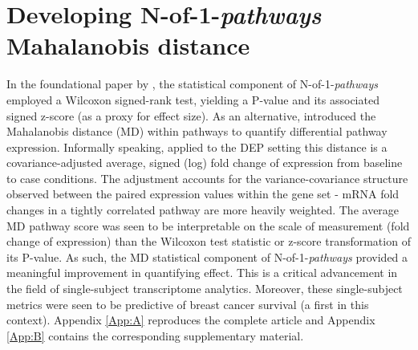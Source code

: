 \chapter{Developing N-of-1-\emph{pathways} \\Mahalanobis distance} \label{Chap:md}

\indent \indent In the foundational paper by \citet{Gardeux2014}, the statistical component of N-of-1-\emph{pathways} employed a Wilcoxon signed-rank test, yielding a P-value and its associated signed z-score (as a proxy for effect size). As an alternative, \citet{Schissler2015} introduced the Mahalanobis distance (MD) within pathways to quantify differential pathway expression. Informally speaking, applied to the DEP setting this distance is a covariance-adjusted average, signed (log) fold change of expression from baseline to case conditions. The adjustment accounts for the variance-covariance structure observed between the paired expression values within the gene set - mRNA fold changes in a tightly correlated pathway are more heavily weighted. The average MD pathway score was seen to be interpretable on the scale of measurement (fold change of expression) than the Wilcoxon test statistic or z-score transformation of its P-value. As such, the MD statistical component of N-of-1-\emph{pathways} provided a meaningful improvement in quantifying effect. This is a critical advancement in the field of single-subject transcriptome analytics. Moreover, these single-subject metrics were seen to be predictive of breast cancer survival (a first in this context). Appendix \ref{App:A} reproduces the complete \citet{Schissler2015} article and Appendix \ref{App:B} contains the corresponding supplementary material.
%
